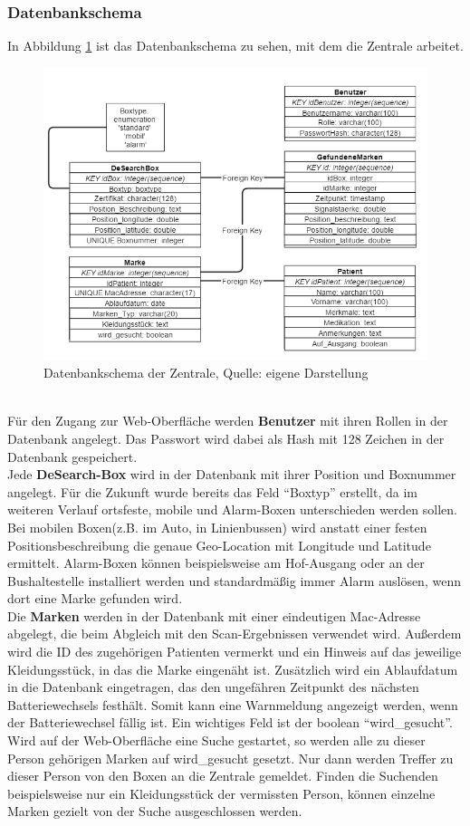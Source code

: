 \subsubsection{Datenbankschema}
In Abbildung \ref{img:db-schema} ist das Datenbankschema zu sehen, mit dem die Zentrale arbeitet. 
\begin{figure}
	\centering
	\includegraphics[width=1.0\linewidth]{images/db-schema}
	\caption[Datenbankschema der Zentrale]{Datenbankschema der Zentrale, Quelle: eigene Darstellung}
	\label{img:db-schema}
\end{figure}
\\Für den Zugang zur Web-Oberfläche werden \textbf{Benutzer} mit ihren Rollen in der Datenbank angelegt. Das Passwort wird dabei als Hash mit 128 Zeichen in der Datenbank gespeichert. 
\\Jede \textbf{DeSearch-Box} wird in der Datenbank mit ihrer Position und Boxnummer angelegt. Für die Zukunft wurde bereits das Feld \enquote{Boxtyp} erstellt, da im weiteren Verlauf ortsfeste, mobile und Alarm-Boxen unterschieden werden sollen. Bei mobilen Boxen(z.B. im Auto, in Linienbussen) wird anstatt einer festen Positionsbeschreibung die genaue Geo-Location mit Longitude und Latitude ermittelt. Alarm-Boxen können beispielsweise am Hof-Ausgang oder an der Bushaltestelle installiert werden und standardmäßig immer Alarm auslösen, wenn dort eine Marke gefunden wird.
\\Die \textbf{Marken} werden in der Datenbank mit einer eindeutigen Mac-Adresse abgelegt, die beim Abgleich mit den Scan-Ergebnissen verwendet wird. Außerdem wird die ID des zugehörigen Patienten vermerkt und ein Hinweis auf das jeweilige Kleidungsstück, in das die Marke eingenäht ist. Zusätzlich wird ein Ablaufdatum in die Datenbank eingetragen, das den ungefähren Zeitpunkt des nächsten Batteriewechsels festhält. Somit kann eine Warnmeldung angezeigt werden, wenn der Batteriewechsel fällig ist. Ein wichtiges Feld ist der boolean \enquote{wird\_gesucht}. Wird auf der Web-Oberfläche eine Suche gestartet, so werden alle zu dieser Person gehörigen Marken auf wird\_gesucht gesetzt. Nur dann werden Treffer zu dieser Person von den Boxen an die Zentrale gemeldet. Finden die Suchenden beispielsweise nur ein Kleidungsstück der vermissten Person, können einzelne Marken gezielt von der Suche ausgeschlossen werden. 
